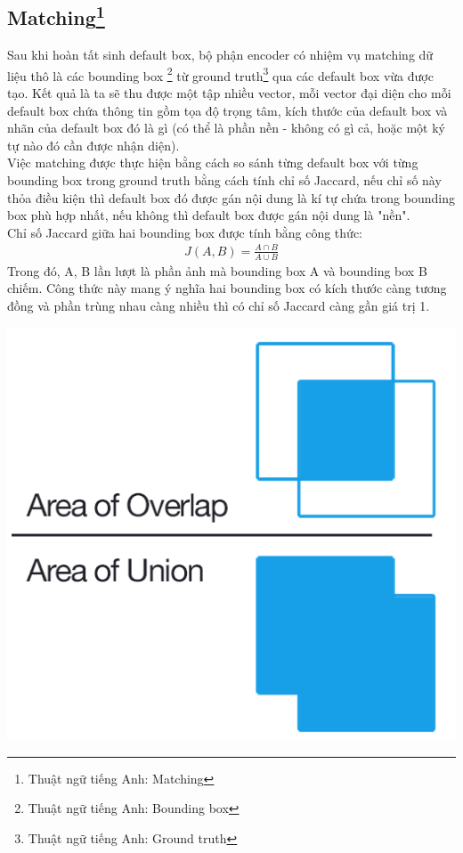 \documentclass[a4paper]{article}
\theoremstyle{definition}
\begin{document}
	\subsection*{Matching\footnote{Thuật ngữ tiếng Anh: Matching}}
	
	Sau khi hoàn tất sinh default box, bộ phận encoder có nhiệm vụ matching dữ liệu thô là các bounding box \footnote{Thuật ngữ tiếng Anh: Bounding box} từ ground truth\footnote{Thuật ngữ tiếng Anh: Ground truth} qua các default box vừa được tạo. Kết quả là ta sẽ thu được một tập nhiều vector, mỗi vector đại diện cho mỗi default box chứa thông tin gồm tọa độ trọng tâm, kích thước của default box và nhãn của default box đó là gì (có thể là phần nền - không có gì cả, hoặc một ký tự nào đó cần được nhận diện). \\
	
	Việc matching được thực hiện bằng cách so sánh từng default box với từng bounding box trong ground truth bằng cách tính chỉ số Jaccard\cite{Jaccard}, nếu chỉ số này thỏa điều kiện thì default box đó được gán nội dung là kí tự chứa trong bounding box phù hợp nhất, nếu không thì default box được gán nội dung là "nền".\\
	
	Chỉ số Jaccard\cite{Jaccard} giữa hai bounding box được tính bằng công thức:
	\begin{align}
	J(A, B) = \frac{A \cap B }{ A \cup B }
	\end{align}
	Trong đó, A, B lần lượt là phần ảnh mà bounding box A và bounding box B chiếm. Công thức này mang ý nghĩa hai bounding box có kích thước càng tương đồng và phần trùng nhau càng nhiều thì có chỉ số Jaccard\cite{Jaccard} càng gần giá trị 1.\\
	
	\begin{center}
		\centering
		\includegraphics[width=0.5\linewidth]{Intersection_over_Union_-_visual_equation.png}
		\vspace{0.5cm}
	\end{center}
	
\end{document}
